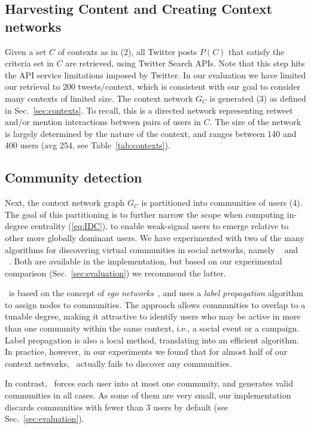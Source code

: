 \subsection{Harvesting Content and Creating Context networks} \label{sec:harvesting}
%
Given a set $C$ of contexts as in (2), all Twitter posts $P(C)$ that satisfy the criteria set in $C$ are retrieved, using Twitter Search APIs.
Note that this step hits the API service limitations imposed by Twitter. In our evaluation we have limited our retrieval to 200 tweets/context, which is consistent with our goal to consider many contexts of limited size.
%
The context network $G_C$ is generated (3) as defined in Sec.~\ref{sec:contexts}. To recall, this is a directed network representing retweet and/or mention interactions between pairs of users in $C$. 
The size of the network is largely determined by the nature of the context, and  ranges between 140 and 400 users (avg 254, see Table~\ref{tab:contexts}).

\subsection{Community detection} \label{sec:communities}

Next, the context network graph $G_C$  is partitioned into communities of users (4).
The goal of this partitioning is to further narrow the scope when computing in-degree centrality (\ref{eq:IDC}), 
to enable weak-signal users to emerge relative to other more globally dominant users.
%
We have experimented with two of the many algorithms for discovering virtual communities in social networks, namely \demon~\cite{Coscia:2012:DLD:2339530.2339630} and  \infomap~\cite{INFOMAP}. 
Both are available in the implementation, but based on our experimental comparison (Sec.~\ref{sec:evaluation}) we recommend the latter.

\demon~is based on the concept of \textit{ego networks}~\cite{Arnaboldi2013}, and uses a \textit{label propagation} algorithm to assign nodes to communities.  
The approach allows communities to overlap to a tunable degree, making it attractive to identify users who may be active in more than one community within the same context, i.e., a social event or a campaign.
Label propagation is also a local method, translating into an efficient algorithm.
In practice, however, in our experiments we found that for almost half of our context networks, \demon~actually fails to discover any communities.

In contrast, \infomap~forces each user into at most one community, and generates valid communities in all cases. 
As some of them are very small, our  implementation discards communities with fewer than 3 users by default (see Sec.~\ref{sec:evaluation}).
%

